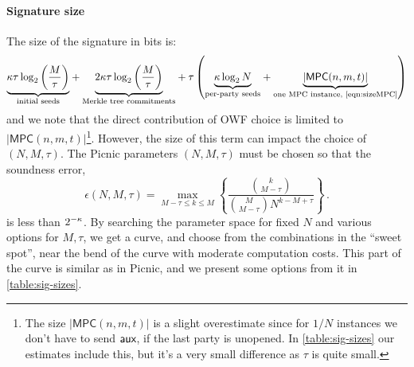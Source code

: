 \paragraph{Signature size}
The size of the signature in bits is:
\begin{align*}
\textunderbrace{\secpar\tau\log_2\left(\frac{M}{\tau}\right)}{initial seeds} + 
\textunderbrace{2\secpar\tau\log_2\left(\frac{M}{\tau}\right)}{Merkle tree commitments} + 
\tau\left( 
     \textunderbrace{\secpar\log_2N}{per-party seeds}  + 
     \textunderbrace{|\textsf{MPC}(n,m,t)|}{one MPC instance, \cref{eqn:sizeMPC}} 
\right)
\end{align*} 
and we note that the direct contribution of OWF choice is limited to
$|\textsf{MPC}(n,m,t)|$\footnote{The size $|\textsf{MPC}(n,m,t)|$ is a slight
overestimate since for $1/N$ instances we don't have to send $\textsf{aux}$, if the
last party is unopened. In \cref{table:sig-sizes} our estimates include this,
but it's a very small difference as $\tau$ is quite small. }.  However, the
size of this term can impact the choice of $(N,M,\tau)$.  The Picnic parameters
$(N, M, \tau)$ must be chosen so that the soundness error, 
\begin{equation*} \label{eqn:soundness}
    \epsilon(N,M,\tau) = \max_{M-\tau \le k \le M} \left\lbrace  \frac{\binom{k}{M-\tau} }{\binom{M}{M-\tau} N^{k-M+\tau} } \right\rbrace\,.
\end{equation*}
is less than $2^{-\kappa}$.
By searching the parameter space for fixed $N$ and various options for $M,
\tau$, we get a curve, and choose from the combinations in the ``sweet spot'',
near the bend of the curve with moderate computation costs. This part of the curve is
similar as in Picnic, and we present some options from it in \cref{table:sig-sizes}.

